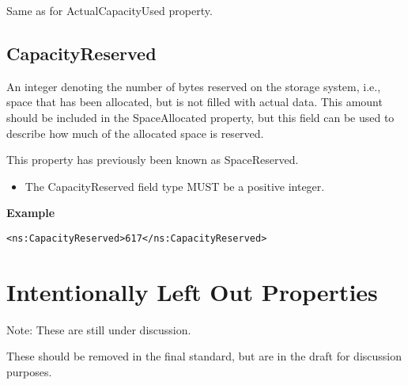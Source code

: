 Same as for ActualCapacityUsed property.


\subsection{CapacityReserved}

An integer denoting the number of bytes reserved on the storage system, i.e.,
space that has been allocated, but is not filled with actual data. This amount
should be included in the SpaceAllocated property, but this field can be used
to describe how much of the allocated space is reserved.

This property has previously been known as SpaceReserved.

\begin{itemize}
\item The CapacityReserved field type MUST be a positive integer.
\end{itemize}

{\bf Example}
\begin{verbatim}
<ns:CapacityReserved>617</ns:CapacityReserved>
\end{verbatim}


\section{Intentionally Left Out Properties}

Note: These are still under discussion.

These should be removed in the final standard, but are in the draft for
discussion purposes.

